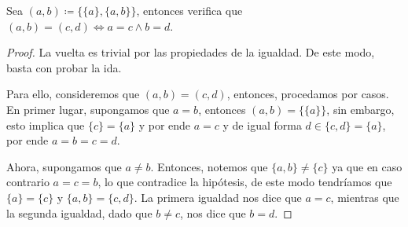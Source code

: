 \begin{exercise}[1.1]
  Sea $(a,b) \coloneqq \{\{a\}, \{a,b\}\}$, entonces verifica que $(a,b) = (c,d) \iff a=c \land b=d$.
\end{exercise}
\begin{proof}
  La vuelta es trivial por las propiedades de la igualdad. De este modo, basta con probar la ida.

  Para ello, consideremos que $(a,b) = (c,d)$, entonces, procedamos por casos. En primer lugar, supongamos que $a = b$, entonces $(a,b) = \{\{a\}\}$, sin embargo, esto implica que $\{c\} = \{a\}$ y por ende $a = c$ y de igual forma $d \in \{c,d\} 
  = \{a\}$, por ende $a = b = c = d$.

  Ahora, supongamos que $a \neq b$. Entonces, notemos que $\{a,b\} \neq \{c\}$ ya que en caso contrario $a = c = b$, lo que contradice la hipótesis, de este modo tendríamos que $\{a\} = \{c\}$ y $\{a,b\} = \{c,d\}$. La primera igualdad nos dice que $a = c$, mientras que la segunda igualdad, dado que $b \neq c$, nos dice que $b = d$.
\end{proof}